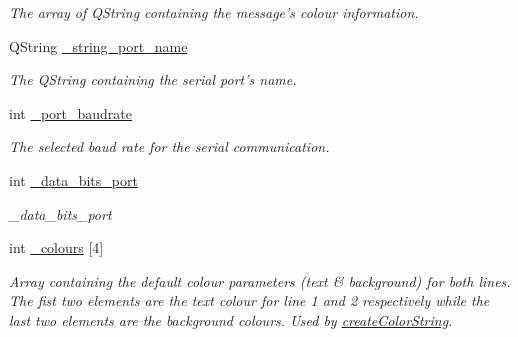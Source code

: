 \begin{DoxyCompactItemize}
\begin{DoxyCompactList}\small\item\em The array of Q\+String containing the message's colour information. \end{DoxyCompactList}\item 
\hypertarget{class_matrice_rgb_a8298c7c9169743e9118e39e1d87edc8e}{Q\+String \hyperlink{class_matrice_rgb_a8298c7c9169743e9118e39e1d87edc8e}{\+\_\+string\+\_\+port\+\_\+name}}\label{class_matrice_rgb_a8298c7c9169743e9118e39e1d87edc8e}

\begin{DoxyCompactList}\small\item\em The Q\+String containing the serial port's name. \end{DoxyCompactList}\item 
\hypertarget{class_matrice_rgb_a7a47ff848c6f752eaf5752795fd5be92}{int \hyperlink{class_matrice_rgb_a7a47ff848c6f752eaf5752795fd5be92}{\+\_\+port\+\_\+baudrate}}\label{class_matrice_rgb_a7a47ff848c6f752eaf5752795fd5be92}

\begin{DoxyCompactList}\small\item\em The selected baud rate for the serial communication. \end{DoxyCompactList}\item 
\hypertarget{class_matrice_rgb_af6c6d8180553a5aaff757656ce9fc579}{int \hyperlink{class_matrice_rgb_af6c6d8180553a5aaff757656ce9fc579}{\+\_\+data\+\_\+bits\+\_\+port}}\label{class_matrice_rgb_af6c6d8180553a5aaff757656ce9fc579}

\begin{DoxyCompactList}\small\item\em \+\_\+data\+\_\+bits\+\_\+port \end{DoxyCompactList}\item 
\hypertarget{class_matrice_rgb_a0d66effd9d22be7ca9540df2fa534e7f}{int \hyperlink{class_matrice_rgb_a0d66effd9d22be7ca9540df2fa534e7f}{\+\_\+colours} \mbox{[}4\mbox{]}}\label{class_matrice_rgb_a0d66effd9d22be7ca9540df2fa534e7f}

\begin{DoxyCompactList}\small\item\em Array containing the default colour parameters (text \& background) for both lines. The fist two elements are the text colour for line 1 and 2 respectively while the last two elements are the background colours. Used by \hyperlink{class_matrice_rgb_a05ea8eaf536cc656dfe993710221aa30}{create\+Color\+String}. \end{DoxyCompactList}\end{DoxyCompactItemize}


